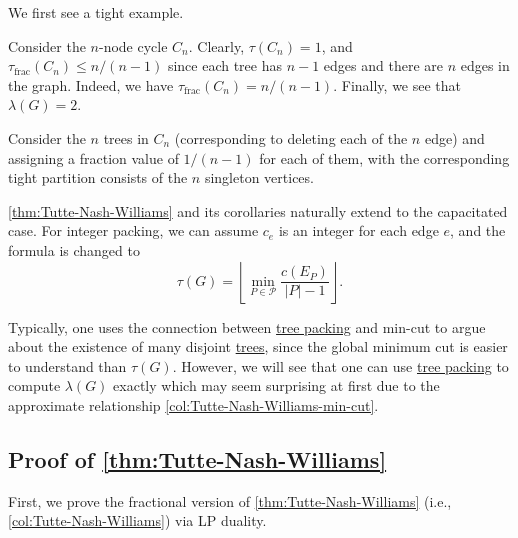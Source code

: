 We first see a tight example.

\begin{eg}[Cycle]
	Consider the \(n\)-node cycle \(C_n\). Clearly, \(\tau (C_n) = 1\), and \(\tau _{\text{frac} }(C_n) \leq n / (n-1)\) since each tree has \(n-1\) edges and there are \(n\) edges in the graph. Indeed, we have \(\tau _{\text{frac} } (C_n) = n / (n-1)\). Finally, we see that \(\lambda (G) = 2\).
\end{eg}
\begin{explanation}
	Consider the \(n\) trees in \(C_n\) (corresponding to deleting each of the \(n\) edge) and assigning a fraction value of \(1 / (n-1)\) for each of them, with the corresponding tight partition consists of the \(n\) singleton vertices.
\end{explanation}

\begin{note}
	\autoref{thm:Tutte-Nash-Williams} and its corollaries naturally extend to the capacitated case. For integer packing, we can assume \(c_e\) is an integer for each edge \(e\), and the formula is changed to
	\[
		\tau (G)
		= \left\lfloor \min _{P \in \mathcal{P} } \frac{c(E_P)}{\lvert P \rvert - 1} \right\rfloor .
	\]
\end{note}

Typically, one uses the connection between \hyperref[prb:TP]{tree packing} and min-cut to argue about the existence of many disjoint \hyperref[def:spanning-tree]{trees}, since the global minimum cut is easier to understand than \(\tau (G)\). However, we will see that one can use \hyperref[prb:TP]{tree packing} to compute \(\lambda (G)\) exactly which may seem surprising at first due to the approximate relationship \autoref{col:Tutte-Nash-Williams-min-cut}.

\subsection{Proof of \autoref{thm:Tutte-Nash-Williams}}
First, we prove the fractional version of \autoref{thm:Tutte-Nash-Williams} (i.e., \autoref{col:Tutte-Nash-Williams}) via LP duality.

